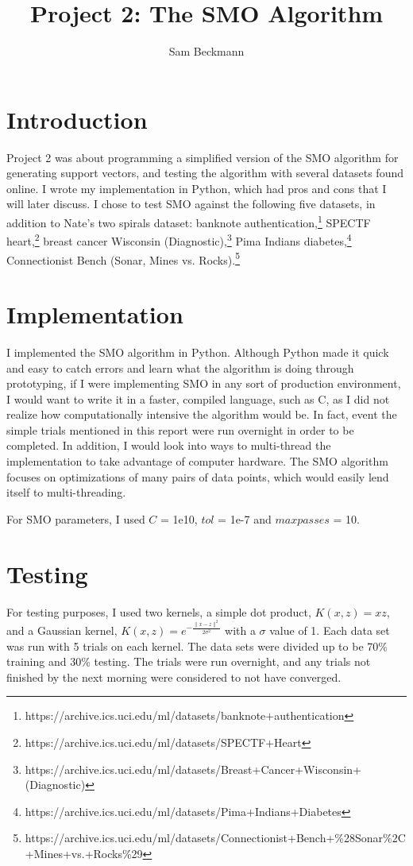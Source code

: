 \documentclass{article}
\begin{document}
\title{Project 2: The SMO Algorithm}
\author{Sam Beckmann}
\maketitle
\section{Introduction}
Project 2 was about programming a simplified version of the SMO algorithm for generating support vectors, and testing the algorithm with several datasets found online. I wrote my implementation in Python, which had pros and cons that I will later discuss. I chose to test SMO against the following five datasets, in addition to Nate's two spirals dataset: banknote authentication,\footnote{https://archive.ics.uci.edu/ml/datasets/banknote+authentication} SPECTF heart,\footnote{https://archive.ics.uci.edu/ml/datasets/SPECTF+Heart} breast cancer Wisconsin (Diagnostic),\footnote{https://archive.ics.uci.edu/ml/datasets/Breast+Cancer+Wisconsin+(Diagnostic)} Pima Indians diabetes,\footnote{https://archive.ics.uci.edu/ml/datasets/Pima+Indians+Diabetes} Connectionist Bench (Sonar, Mines vs. Rocks).\footnote{https://archive.ics.uci.edu/ml/datasets/Connectionist+Bench+\%28Sonar\%2C+Mines+vs.+Rocks\%29}

\section{Implementation}
I implemented the SMO algorithm in Python. Although Python made it quick and easy to catch errors and learn what the algorithm is doing through prototyping, if I were implementing SMO in any sort of production environment, I would want to write it in a faster, compiled language, such as C, as I did not realize how computationally intensive the algorithm would be. In fact, event the simple trials mentioned in this report were run overnight in order to be completed. In addition, I would look into ways to multi-thread the implementation to take advantage of computer hardware. The SMO algorithm focuses on optimizations of many pairs of data points, which would easily lend itself to multi-threading.

For SMO parameters, I used $C$ = 1e10, $tol$ = 1e-7 and $max passes$ = 10.

\section{Testing}
For testing purposes, I used two kernels, a simple dot product, $K(x, z) = xz$, and a Gaussian kernel, $K(x, z) = e^{-\frac{\|x - z\|^2}{2\sigma{}^2}}$ with a $\sigma$ value of 1. Each data set was run with 5 trials on each kernel. The data sets were divided up to be 70\% training and 30\% testing. The trials were run overnight, and any trials not finished by the next morning were considered to not have converged.
\end{document}
